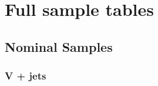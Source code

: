 \chapter{Full sample tables}
\label{app:full-nominal-samples}
\section{Nominal Samples}
\subsection{V + jets}



